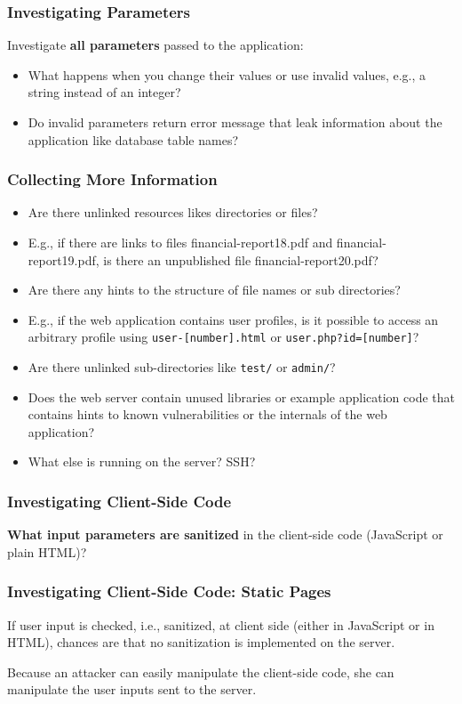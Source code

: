 \documentclass[aspectratio=169]{beamer}
\begin{document}
\begin{frame}
    \frametitle{Investigating Parameters}
    Investigate \textbf{all parameters} passed to the application:
    \begin{itemize}
        \item What happens when you change their values or use invalid values, e.g., a string instead of an integer?
        \item Do invalid parameters return error message that leak information about the application like database table names?
    \end{itemize}
\end{frame}

\begin{frame}
    \frametitle{Collecting More Information}
   \begin{itemize}
       \item Are there unlinked resources likes directories or files?
       \item E.g., if there are links to files financial-report18.pdf and financial-report19.pdf, is there an unpublished file financial-report20.pdf?
       \item Are there any hints to the structure of file names or sub directories?
       \item E.g., if the web application contains user profiles, is it possible to access an arbitrary profile using \texttt{user-[number].html} or \texttt{user.php?id=[number]}?
       \item Are there unlinked sub-directories like \texttt{test/} or \texttt{admin/}?
       \item Does the web server contain unused libraries or example application code that contains hints to known vulnerabilities or the internals of the web application? 
       \item What else is running on the server? SSH?
   \end{itemize}
\end{frame}

\begin{frame}
    \frametitle{Investigating Client-Side Code}
    \textbf{What input parameters are sanitized} in the client-side code (JavaScript or plain HTML)?
\end{frame}

\begin{frame}
    \frametitle{Investigating Client-Side Code: Static Pages}
    If user input is checked, i.e., sanitized, at client side (either in JavaScript or in HTML), chances are that no sanitization is implemented on the server. 
    
    Because an attacker can easily manipulate the client-side code, she can manipulate the user inputs sent to the server.
\end{frame}
\end{document}
